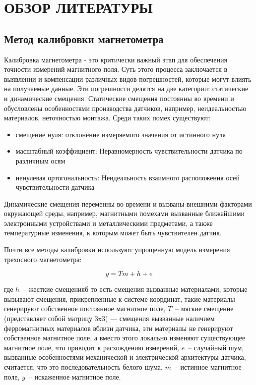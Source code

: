\section{ОБЗОР ЛИТЕРАТУРЫ}
\label{sec:domain}

\subsection{Метод калибровки магнетометра}
Калибровка магнетометра - это критически важный этап для обеспечения точности измерений магнитного поля. 
Суть этого процесса заключается в выявлении и компенсации различных видов погрешностей, которые могут 
влиять на получаемые данные. Эти погрешности делятся на две категории: статические и динамические смещения.
Статические смещения постоянны во времени и обусловлены особенностями производства датчиков, например,
неидеальностью материалов, неточностью монтажа. Среди таких помех существуют: 
\begin{itemize}
    \item смещение нуля: отклонение измеряемого значения от истинного нуля
    \item масштабный коэффициент: Неравномерность чувствительности датчика по различным осям
    \item ненулевая ортогональность: Неидеальность взаимного расположения осей чувствительности датчика
\end{itemize}

Динамические смещения переменны во времени и вызваны внешними факторами окружающей среды, например, магнитными помехами
вызванные ближайшими электронными устройствами и металлическими предметами, 
а также температурные изменения, к которым может быть чувствителен датчик.

Почти все методы калибровки используют упрощенную модель измерения трехосного магнетометра:

$$ y = Tm+h+e$$

где $h$~-- жесткие смещенияб то есть смещения вызванные материалами, которые вызывают смещения, прикрепленные к системе координат, 
такие материалы генерируют собственное  постоянное магнитное поле,
$T$~-- мягкие смещение (представляет собой матрицу 3x3) --- смещения вызванные наличием ферромагнитных материалов вблизи датчика,
эти материалы не генерируют собственное магнитное поле, а вместо этого локально изменяют существующее магнитное поле, что приводит к расхождению измерений,
$e$~-- случайный шум, вызванные особенностями механической и электрической архитектуры датчика, считается, что это последовательность белого шума.
$m$~-- истинное магнитное поле, $y$~-- искаженное магнитное поле.

